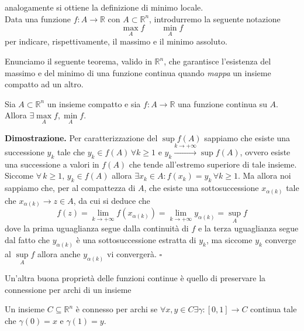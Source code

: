 \noindent analogamente si ottiene la definizione di minimo locale. \\ Data una funzione $f:A \to \mathbb{R}$ con $A \subset \mathbb{R}^n$, introdurremo la seguente notazione 
\begin{equation*}
\max_A{f} \qquad \min_A{f} 
\end{equation*}
per indicare, rispettivamente, il massimo e il minimo assoluto. 

Enunciamo il seguente teorema, valido in $\mathbb{R}^n$, che garantisce l'esistenza del massimo e del minimo di una funzione continua quando \emph{mappa} un insieme compatto ad un altro. 

\vspace{0.5cm}
\begin{theorem}[\textcolor{blue}{di Weierstrass}]
Sia $A \subset \mathbb{R}^n$ un insieme compatto e sia $f: A \to \mathbb{R}$ una funzione continua su $A$. Allora $\exists \max\limits_A{f}, \min\limits_A{f}$. 
\label{thm:weierstrass}
\end{theorem}

\noindent \textbf{Dimostrazione. }
Per caratterizzazione del $\sup{f(A)}$ sappiamo che esiste una successione $y_k$ tale che $y_k \in f(A) \, \forall k \geq 1$ e $y_k \stackrel{k \to +\infty}{\to} \sup f(A)$, ovvero esiste una successione a valori in $f(A)$ che tende all'estremo superiore di tale insieme. Siccome $\forall \, k \geq 1, \, y_k \in f(A)$ allora $\exists x_k \in A: f(x_k) = y_k \, \forall k \geq 1$. Ma allora noi sappiamo che, per al compattezza di $A$, che esiste una sottosuccessione $x_{\alpha (k)}$ tale che $x_{\alpha(k)} \to z \in A$, da cui si deduce che
$$
f(z) = \lim_{k \to +\infty} f(x_{\alpha(k)}) = \lim_{k \to +\infty} y_{\alpha(k)} = \sup_A{f}
$$
dove la prima uguaglianza segue dalla continuità di $f$ e la terza uguaglianza segue dal fatto che $y_{\alpha(k)}$ è una sottosuccessione estratta di $y_k$, ma siccome $y_k$ converge al $\sup\limits_A{f}$ allora anche $y_{\alpha(k)}$ vi convergerà.
\hfill $\square$

\vspace{0.5cm}
Un'altra buona proprietà delle funzioni continue è quello di preservare la connessione per archi di un insieme
\begin{definition}[\textcolor{blue}{insieme connesso per archi}]
	Un insieme $C \subseteq \mathbb{R}^n$ è connesso per archi se $\forall x, y \in C \exists \gamma: [0, 1] \to C$ continua tale che $\gamma(0) = x$ e $\gamma(1) = y$.
\end{definition}

